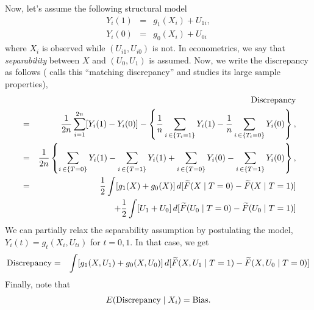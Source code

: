 \documentclass[11pt,titlepage]{article}
\begin{document}
Now, let's assume the following structural model
\begin{eqnarray*}
  Y_i(1) & = & g_1(X_i) + U_{1i}, \\
  Y_i(0) & = & g_0(X_i) + U_{0i}
\end{eqnarray*}
where $X_i$ is observed while $(U_{i1}, U_{i0})$ is not.  In
econometrics, we say that {\it separability} between $X$ and $(U_0,
U_1)$ is assumed. Now, we write the discrepancy as follows
(\citet{AbaImb06} calls this ``matching discrepancy'' and studies its
large sample properties),
\begin{eqnarray*}
  & & {\rm Discrepancy}  \\
  & =  & \frac{1}{2n} \sum_{i=1}^{2n} [Y_i(1) -
  Y_i(0)] - \left\{\frac{1}{n} \sum_{i \, \in \{T_i =1 \}}
  Y_i(1) - \frac{1}{n} \sum_{i \, \in \{T_i =0 \}}
  Y_i(0) \right\}, \\
  & = & \frac{1}{2n} \left\{ \sum_{i\,\in \{T = 0\}} Y_i(1) - 
    \sum_{i\,\in \{T = 1\}}  Y_i(1) + \sum_{i\,\in \{T = 0\}}
  Y_i(0) - \sum_{i\,\in \{T = 1\}} Y_i(0) \right\}, \\
  & = & \frac{1}{2} \int [g_1(X) + g_0(X)] \,d[\widetilde{F}(X \mid T
  = 0) - \widetilde{F}(X \mid T = 1)]  \\
  & & + \frac{1}{2} \int [U_1 + U_0] \,d[\widetilde{F}(U_0 \mid T = 0) - \widetilde{F}(U_0 \mid
  T = 1)]   
\end{eqnarray*}
We can partially relax the separability assumption by postulating the
model, $Y_i(t) = g_t(X_i, U_{ti})$ for $t=0,1$. In that case, we get
\begin{eqnarray*}
  {\rm Discrepancy} & = & \int [g_1(X, U_1) + g_0(X, U_0)]\, d[\widetilde{F}(X, U_1 \mid
  T = 1) - \widetilde{F}(X, U_0 \mid T = 0)] 
\end{eqnarray*}
Finally, note that
\begin{eqnarray*}
  E({\rm Discrepancy} \mid X_i) = {\rm Bias}.
\end{eqnarray*}

\clearpage

 
\end{document}
